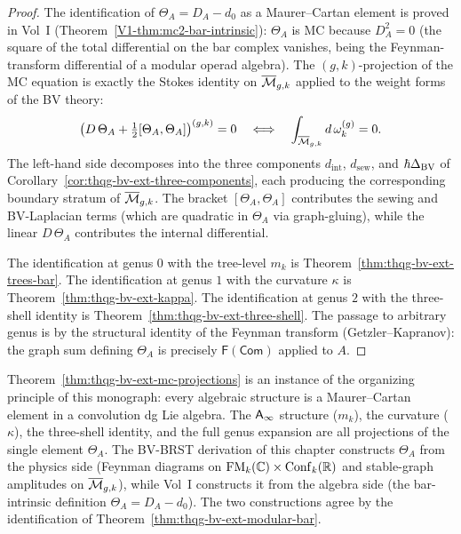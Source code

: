 \begin{proof}
The identification of $\Theta_A = D_A - d_0$ as a Maurer--Cartan
element is proved in Vol~I
(Theorem~\ref*{V1-thm:mc2-bar-intrinsic}):
$\Theta_A$ is MC because $D_A^2 = 0$ (the square of the total
differential on the bar complex vanishes, being the
Feynman-transform differential of a modular operad algebra).
The $(g,k)$-projection of the MC equation is exactly the
Stokes identity on $\overline{\mathcal{M}}_{g,k}$ applied to the
weight forms of the BV theory:
\[
\bigl(D\,\Theta_A + \tfrac{1}{2}[\Theta_A, \Theta_A]
\bigr)^{(g,k)} = 0
\quad\Longleftrightarrow\quad
\int_{\overline{\mathcal{M}}_{g,k}} d\,\omega^{(g)}_k = 0.
\]
The left-hand side decomposes into the three components
$d_{\mathrm{int}}$, $d_{\mathrm{sew}}$, and
$\hbar\Delta_{\mathrm{BV}}$ of
Corollary~\ref{cor:thqg-bv-ext-three-components}, each
producing the corresponding boundary stratum of
$\overline{\mathcal{M}}_{g,k}$. The bracket $[\Theta_A, \Theta_A]$
contributes the sewing and BV-Laplacian terms (which are
quadratic in $\Theta_A$ via graph-gluing), while the linear
$D\,\Theta_A$ contributes the internal differential.

The identification at genus $0$ with the tree-level $m_k$ is
Theorem~\ref{thm:thqg-bv-ext-trees-bar}.
The identification at genus $1$ with the curvature $\kappa$ is
Theorem~\ref{thm:thqg-bv-ext-kappa}.
The identification at genus $2$ with the three-shell identity is
Theorem~\ref{thm:thqg-bv-ext-three-shell}.
The passage to arbitrary genus is by the structural identity of
the Feynman transform (Getzler--Kapranov): the graph sum defining
$\Theta_A$ is precisely $\mathsf{F}(\mathsf{Com})$ applied to $A$.
\end{proof}

\begin{remark}
Theorem~\ref{thm:thqg-bv-ext-mc-projections} is an instance of
the organizing principle of this monograph: every algebraic
structure is a Maurer--Cartan element in a convolution dg Lie
algebra. The $\mathsf{A}_{\infty}$ structure ($m_k$), the curvature ($\kappa$),
the three-shell identity, and the full genus expansion are all
projections of the single element $\Theta_A$. The BV-BRST
derivation of this chapter constructs $\Theta_A$ from the physics
side (Feynman diagrams on $\operatorname{FM}_k(\mathbb{C}) \times \operatorname{Conf}_k(\mathbb{R})$ and
stable-graph amplitudes on $\overline{\mathcal{M}}_{g,k}$), while Vol~I
constructs it from the algebra side (the bar-intrinsic definition
$\Theta_A = D_A - d_0$). The two constructions agree by the
identification of Theorem~\ref{thm:thqg-bv-ext-modular-bar}.
\end{remark}

